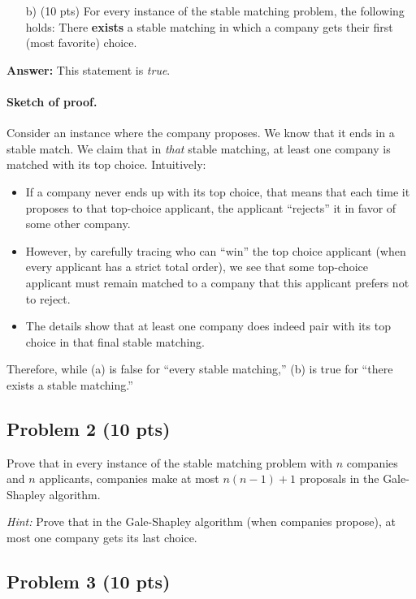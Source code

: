\documentclass[12pt]{article}
\begin{document}
\begin{enumerate}
    
    \item[b)] (10 pts) For every instance of the stable matching problem, the following holds: There \textbf{exists} a stable matching in which a company gets their first (most favorite) choice.
\end{enumerate}

\noindent \textbf{Answer:}
This statement is \emph{true}.

\paragraph{Sketch of proof.}
Consider an instance where the company proposes. We know that it ends in a stable match. We claim that in \emph{that} stable matching, at least one company is matched with its top choice. Intuitively:
\begin{itemize}
    \item If a company never ends up with its top choice, that means that each time it proposes to that top-choice applicant, the applicant ``rejects'' it in favor of some other company. 
    \item However, by carefully tracing who can ``win'' the top choice applicant (when every applicant has a strict total order), we see that some top-choice applicant must remain matched to a company that this applicant prefers not to reject. 
    \item The details show that at least one company does indeed pair with its top choice in that final stable matching.
\end{itemize}

Therefore, while (a) is false for ``every stable matching,'' (b) is true for ``there exists a stable matching.''

\subsection*{Problem 2 (10 pts)}

Prove that in every instance of the stable matching problem with $n$ companies and $n$ applicants, companies make at most $n(n-1)+1$ proposals in the Gale-Shapley algorithm.

\textit{Hint:} Prove that in the Gale-Shapley algorithm (when companies propose), at most one company gets its last choice.

\subsection*{Problem 3 (10 pts)}
\end{document}
